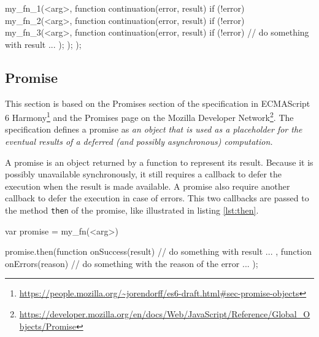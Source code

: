 \begin{code}[js, %
             caption={Example of a cascade of continuations}, %
             label={lst:cbhell}] %
my_fn_1(<arg>, function continuation(error, result) {
  if (!error) {
    my_fn_2(<arg>, function continuation(error, result) {
      if (!error) {
        my_fn_3(<arg>, function continuation(error, result) {
          if (!error) {
            // do something with result ...
          }
        });
      }
    });
  }
});
\end{code}

\subsection{Promise} \label{section:definitions:promise}


This section is based on the Promises section of the specification in ECMAScript 6 Harmony\footnote{\url{https://people.mozilla.org/~jorendorff/es6-draft.html\#sec-promise-objects}} and the Promises page on the Mozilla Developer Network\footnote{\url{https://developer.mozilla.org/en/docs/Web/JavaScript/Reference/Global_Objects/Promise}}.
The specification defines a promise as \textit{an object that is used as a placeholder for the eventual results of a deferred (and possibly asynchronous) computation.}

A promise is an object returned by a function to represent its result.
Because it is possibly unavailable synchronously, it still requires a callback to defer the execution when the result is made available.
A promise also require another callback to defer the execution in case of errors.
This two callbacks are passed to the method \texttt{then} of the promise, like illustrated in listing \ref{lst:then}.

\begin{code}[js, %
             caption={Example of a promise}, %
             label={lst:then}] %
var promise = my_fn(<arg>)

promise.then(function onSuccess(result) {
  // do something with result ...
}, function onErrors(reason) {
  // do something with the reason of the error ...
});
\end{code}

